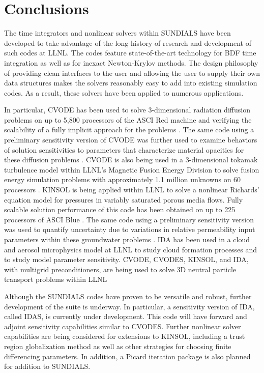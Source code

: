 \section{Conclusions}\label{s:conclusions}

The time integrators and nonlinear solvers within SUNDIALS have been
developed to take advantage of the long history of research and development
of such codes at LLNL.  The codes feature state-of-the-art 
technology for BDF time integration as well as for inexact Newton-Krylov
methods.  The design philosophy of providing clean interfaces to the 
user and allowing the user to supply their own data structures makes the 
solvers reasonably easy to add into existing simulation codes.  As a result,
these solvers have been applied to numerous applications.

In particular, CVODE has been used to solve 3-dimensional radiation diffusion
problems on up to 5,800 processors of the ASCI Red machine and
verifying the scalability 
of a fully implicit approach for the problems \cite{BrWo:01}.
The same code using a preliminary sensitivity version of CVODE was 
further used to examine behaviors of solution sensitivities to 
parameters that characterize material opacities for these
diffusion problems \cite{LWG:03,LHB:00}.  CVODE is also being used in a 
3-dimensional tokamak turbulence model within LLNL's 
Magnetic Fusion Energy Division to solve fusion energy simulation problems
with approximately 1.1 million unknowns on 60 processors \cite{RXH:02}.
KINSOL is being applied within
LLNL to solve a nonlinear Richards' equation model for pressures in
variably saturated porous media flows.  
Fully scalable solution performance of this code has been obtained on
up to 225 processors of ASCI Blue \cite{JoWo:01,Woo:98}.  The same code using 
a preliminary sensitivity version was used to quantify
uncertainty due to variations in relative permeability input parameters
within these groundwater problems \cite{WGM:02}.
IDA has been used in a cloud and aerosol microphysics
model at LLNL to study cloud formation processes and to study model
parameter sensitivity.
CVODE, CVODES, KINSOL, and IDA, with multigrid preconditioners, 
are being used to
solve 3D neutral particle transport problems within LLNL

Although the SUNDIALS codes have proven to be 
versatile and robust, 
further development of the suite is underway.  
In particular, a sensitivity version of IDA, called IDAS, is 
currently under development.  This code will have forward and adjoint
sensitivity capabilities similar to CVODES.  Further nonlinear solver
capabilities are being considered for extensions to KINSOL, including 
a trust region globalization method as well as other strategies for
choosing finite differencing parameters.  In addition, a Picard iteration 
package is also planned for addition to SUNDIALS.  



